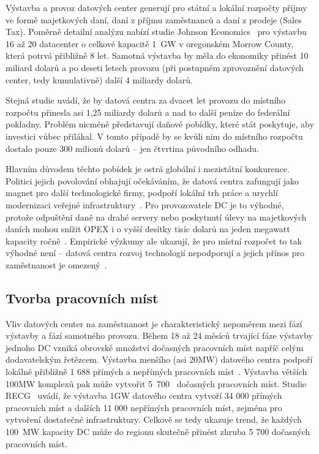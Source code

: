 Výstavba a provoz datových center generují pro státní a lokální rozpočty příjmy ve formě majetkových daní, daní z příjmu zaměstnanců a daní z prodeje (Sales Tax). Poměrně detailní analýzu nabízí studie Johnson Economics~\cite{johnson_economics_economic_2025} pro výstavbu 16 až 20 datacenter o celkové kapacitě 1~GW v oregonském Morrow County, která potrvá přibližně 8 let. Samotná výstavba by měla do ekonomiky přinést 10 miliard dolarů a po deseti letech provozu (při postupném zprovoznění datových center, tedy kumulativně) další 4 miliardy dolarů. 

Stejná studie uvádí, že by datová centra za dvacet let provozu do místního rozpočtu přinesla asi 1,25 miliardy dolarů a nad to další peníze do federální pokladny. Problém nicméně představují daňové pobídky, které stát poskytuje, aby investici vůbec přilákal. V tomto případě by se kvůli nim do místního rozpočtu dostalo pouze 300 milionů dolarů -- jen čtvrtina původního odhadu.

Hlavním důvodem těchto pobídek je ostrá globální i mezistátní konkurence. Politici jejich povolování obhajují očekáváním, že datová centra zafungují jako magnet pro další technologické firmy, podpoří lokální trh práce a urychlí modernizaci veřejné infrastruktury~\cite{gargano_subsidizing_2025}. Pro provozovatele DC je to výhodné, protože odpuštění daně na drahé servery nebo poskytnutí úlevy na majetkových daních mohou snížit OPEX i o vyšší desítky tisíc dolarů na jeden megawatt kapacity ročně~\cite[s.~27]{gargano_subsidizing_2025}. Empirické výzkumy ale ukazují, že pro místní rozpočet to tak výhodné není -- datová centra rozvoj technologií nepodporují a jejich přínos pro zaměstnanost je omezený~\cite{gargano_subsidizing_2025,green_what_2025}.

\subsection{Tvorba pracovních míst}
\label{subsec:zamestnanost}

Vliv datových center na zaměstnanost je charakteristický nepoměrem mezi fází výstavby a fází samotného provozu. Během 18 až 24 měsíců trvající fáze výstavby jednoho DC vzniká obrovské množství dočasných pracovních míst napříč celým dodavatelským řetězcem. Výstavba menšího (asi 20MW) datového centra podpoří lokálně přibližně 1 688 přímých a nepřímých pracovních míst~\cite{pham_data_2017}. Výstavba větších 100MW komplexů pak může vytvořit 5~700~\cite[s.~6]{to_albertas_2025} dočasných pracovních míst. Studie RECG~\cite[s.~1]{diao_economic_2025} uvádí, že výstavba 1GW datového centra vytvoří 34 000 přímých pracovních míst a dalších 11 000 nepřímých pracovních míst, zejména pro vytvoření dostatečné infrastruktury. Celkově se tedy ukazuje trend, že každých 100~MW kapacity DC může do regionu skutečně přinést zhruba 5 700 dočasných pracovních míst.

